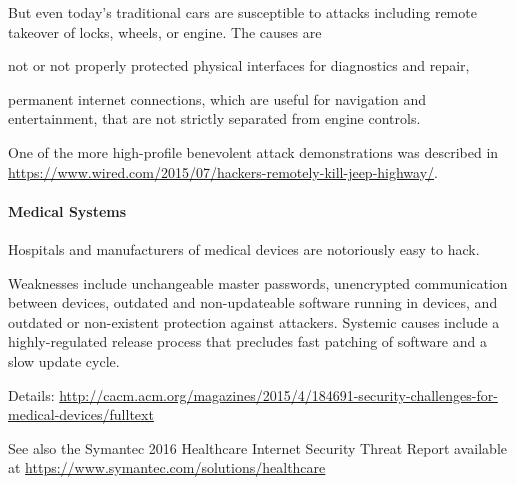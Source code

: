 But even today's traditional cars are susceptible to attacks including remote takeover of locks, wheels, or engine.
The causes are
\begin{compactitem}
 \item not or not properly protected physical interfaces for diagnostics and repair,
 \item permanent internet connections, which are useful for navigation and entertainment, that are not strictly separated from engine controls.
\end{compactitem}
One of the more high-profile benevolent attack demonstrations was described in \url{https://www.wired.com/2015/07/hackers-remotely-kill-jeep-highway/}.

\paragraph{Medical Systems}
Hospitals and manufacturers of medical devices are notoriously easy to hack.

Weaknesses include unchangeable master passwords, unencrypted communication between devices, outdated and non-updateable software running in devices, and outdated or non-existent protection against attackers.
Systemic causes include a highly-regulated release process that precludes fast patching of software and a slow update cycle.

Details:
\url{http://cacm.acm.org/magazines/2015/4/184691-security-challenges-for-medical-devices/fulltext}

See also the Symantec 2016 Healthcare Internet Security Threat Report available at \url{https://www.symantec.com/solutions/healthcare}

